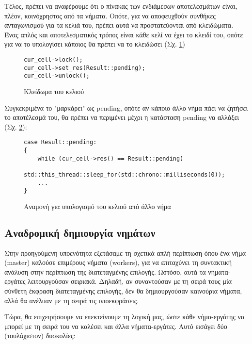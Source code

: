 Τέλος, πρέπει να αναφέρουμε ότι ο πίνακας των ενδιάμεσων αποτελεσμάτων είναι, πλέον, κοινόχρηστος από τα νήματα.
Οπότε, για να αποφευχθούν συνθήκες ανταγωνισμού για τα κελιά του, πρέπει αυτά να προστατεύονται από κλειδώματα.
Ένας απλός και αποτελεσματικός τρόπος είναι κάθε κελί να έχει το κλειδί του, οπότε για να το υπολογίσει κάποιος θα πρέπει να το κλειδώσει (Σχ. \ref{fig:lock})

\begin{figure}[h]
\setlength\partopsep{-\topsep}%
\begin{verbatim}
cur_cell->lock();
cur_cell->set_res(Result::pending);
cur_cell->unlock();
\end{verbatim}
  \caption{Κλείδωμα του κελιού}
\label{fig:lock}
\end{figure}

Συγκεκριμένα το "μαρκάρει" ως pending, οπότε αν κάποιο άλλο νήμα πάει να ζητήσει το αποτέλεσμά του, θα πρέπει να περιμένει μέχρι η κατάσταση pending να αλλάξει (Σχ. \ref{fig:pending}):

\begin{figure}[h]
\setlength\partopsep{-\topsep}%
\begin{verbatim}
case Result::pending:
{
    while (cur_cell->res() == Result::pending) 
        std::this_thread::sleep_for(std::chrono::milliseconds(0));
    ...
}
\end{verbatim}
  \caption{Αναμονή για υπολογισμό του κελιού από άλλο νήμα}
\label{fig:pending}
\end{figure}

\subsection{Αναδρομική δημιουργία νημάτων}

Στην προηγούμενη υποενότητα εξετάσαμε τη σχετικά απλή περίπτωση όπου ένα νήμα (master) καλούσε επιμέρους νήματα (workers), για να επιταχύνει τη συντακτική ανάλυση στην περίπτωση της διατεταγμένης επιλογής.
Ωστόσο, αυτά τα νήματα-εργάτες λειτουργούσαν σειριακά.
Δηλαδή, αν συναντούσαν με τη σειρά τους μία σύνθετη έκφραση διατεταγμένης επιλογής, δεν θα δημιουργούσαν καινούρια νήματα, αλλά θα ανέλυαν με τη σειρά τις υποεκφράσεις.

Τώρα, θα επιχειρήσουμε να επεκτείνουμε τη λογική μας, ώστε κάθε νήμα-εργάτης να μπορεί με τη σειρά του να καλέσει και άλλα νήματα-εργάτες.
Αυτό εισάγει δύο (τουλάχιστον) δυσκολίες:


